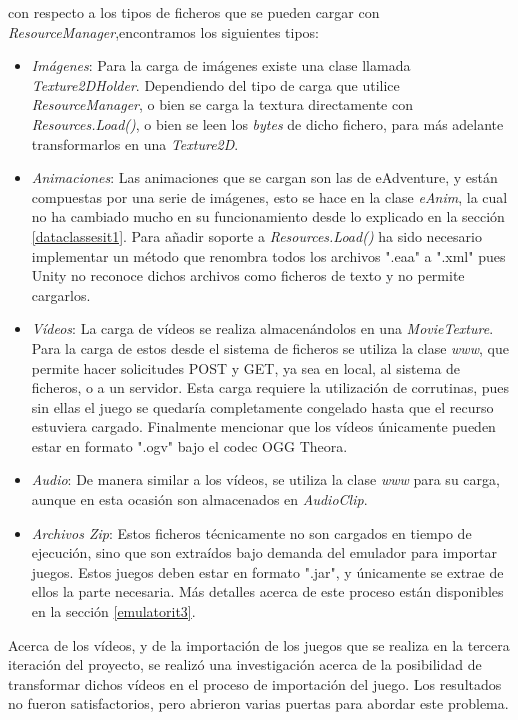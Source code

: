 con respecto a los tipos de ficheros que se pueden cargar con \textit{ResourceManager},encontramos los siguientes tipos:
\begin{itemize}
	\item \textit{Imágenes}: Para la carga de imágenes existe una clase llamada \textit{Texture2DHolder}. Dependiendo del tipo de carga que utilice \textit{ResourceManager}, o bien se carga la textura directamente con \textit{Resources.Load()}, o bien se leen los \textit{bytes} de dicho fichero, para más adelante transformarlos en una \textit{Texture2D}.
	
	\item \textit{Animaciones}: Las animaciones que se cargan son las de eAdventure, y están compuestas por una serie de imágenes, esto se hace en la clase \textit{eAnim}, la cual no ha cambiado mucho en su funcionamiento desde lo explicado en la sección \ref{dataclassesit1}. Para añadir soporte a \textit{Resources.Load()} ha sido necesario implementar un método que renombra todos los archivos ".eaa" a ".xml" pues Unity no reconoce dichos archivos como ficheros de texto y no permite cargarlos.
	
	\item \textit{Vídeos}: La carga de vídeos se realiza almacenándolos en una \textit{MovieTexture}. Para la carga de estos desde el sistema de ficheros se utiliza la clase \textit{www}, que permite hacer solicitudes POST y GET, ya sea en local, al sistema de ficheros, o a un servidor. Esta carga requiere la utilización de corrutinas, pues sin ellas el juego se quedaría completamente congelado hasta que el recurso estuviera cargado. Finalmente mencionar que los vídeos únicamente pueden estar en formato ".ogv" bajo el codec OGG Theora.
	
	\item \textit{Audio}: De manera similar a los vídeos, se utiliza la clase \textit{www} para su carga, aunque en esta ocasión son almacenados en \textit{AudioClip}.
	
	\item \textit{Archivos Zip}: Estos ficheros técnicamente no son cargados en tiempo de ejecución, sino que son extraídos bajo demanda del emulador para importar juegos. Estos juegos deben estar en formato ".jar", y únicamente se extrae de ellos la parte necesaria. Más detalles acerca de este proceso están disponibles en la sección \ref{emulatorit3}.
\end{itemize}

Acerca de los vídeos, y de la importación de los juegos que se realiza en la tercera iteración del proyecto, se realizó una investigación acerca de la posibilidad de transformar dichos vídeos en el proceso de importación del juego. Los resultados no fueron satisfactorios, pero abrieron varias puertas para abordar este problema.

